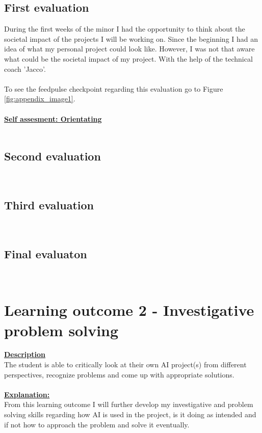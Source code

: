 \documentclass{article}
\begin{document}
\subsection{First evaluation}
During the first weeks of the minor I had the opportunity to think about the societal impact of the projects I will 
be working on. Since the beginning I had an idea of what my personal project could look like. However, I was not that aware
what could be the societal impact of my project. With the help of the technical coach 'Jacco'.\\\\
To see the feedpulse checkpoint regarding this evaluation go to Figure \ref{fig:appendix_image1}.\\\\
\underline{\textbf{Self assesment: Orientating}}\\\\
\subsection{Second evaluation}\\
\subsection{Third evaluation}\\
\subsection{Final evaluaton}\\

\section{Learning outcome 2 - Investigative problem solving}
\underline{\textbf{Description}}\\
The student is able to critically look at their own AI project(s) from different perspectives, 
recognize problems and come up with appropriate solutions.\\\\ 
\underline{\textbf{Explanation:}}\\
From this learning outcome I will further develop my investigative and problem solving skills regarding 
how AI is used in the project, is it doing as intended and if not how to approach the problem and solve it 
eventually.
\end{document}
